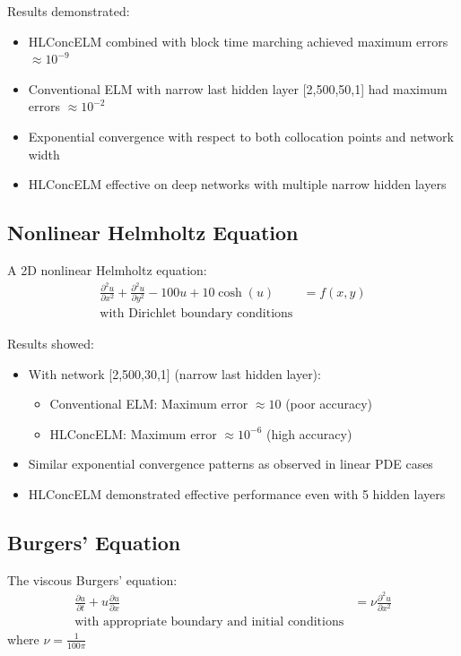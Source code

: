 \documentclass[11pt,a4paper]{article}
\begin{document}
Results demonstrated:
\begin{itemize}
    \item HLConcELM combined with block time marching achieved maximum errors $\approx 10^{-9}$
    \item Conventional ELM with narrow last hidden layer [2,500,50,1] had maximum errors $\approx 10^{-2}$
    \item Exponential convergence with respect to both collocation points and network width
    \item HLConcELM effective on deep networks with multiple narrow hidden layers
\end{itemize}

\subsection{Nonlinear Helmholtz Equation}

A 2D nonlinear Helmholtz equation:
\begin{align}
\frac{\partial^2 u}{\partial x^2} + \frac{\partial^2 u}{\partial y^2} - 100u + 10\cosh(u) &= f(x,y) \\
\text{with Dirichlet boundary conditions}
\end{align}

Results showed:
\begin{itemize}
    \item With network [2,500,30,1] (narrow last hidden layer):
        \begin{itemize}
            \item Conventional ELM: Maximum error $\approx 10$ (poor accuracy)
            \item HLConcELM: Maximum error $\approx 10^{-6}$ (high accuracy)
        \end{itemize}
    \item Similar exponential convergence patterns as observed in linear PDE cases
    \item HLConcELM demonstrated effective performance even with 5 hidden layers
\end{itemize}

\subsection{Burgers' Equation}

The viscous Burgers' equation:
\begin{align}
\frac{\partial u}{\partial t} + u\frac{\partial u}{\partial x} &= \nu\frac{\partial^2 u}{\partial x^2} \\
\text{with appropriate boundary and initial conditions}
\end{align}
where $\nu = \frac{1}{100\pi}$
\end{document}
